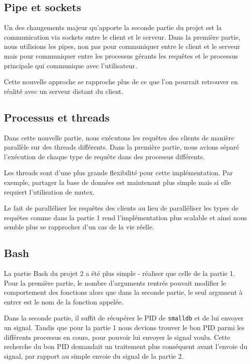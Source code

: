 \documentclass[utf8]{article}
\begin{document}
\subsection{Pipe et sockets}

Un des changements majeur qu'apporte la seconde partie du projet est la communication via sockets entre le client et le serveur. Dans la première partie, nous utilisions les pipes, non pas pour communiquer entre le client et le serveur mais pour communiquer entre les processus gérants les requêtes et le processus principale qui communique avec l'utilisateur.

Cette nouvelle approche se rapproche plus de ce que l'on pourrait retrouver en réalité avec un serveur distant du client.


\subsection{Processus et threads}

Dans cette nouvelle partie, nous exécutons les requêtes des clients de manière parallèle sur des threads différents. Dans la première partie, nous avions séparé l'exécution de chaque type de requête dans des processus différents.

Les threads sont d'une plus grande flexibilité pour cette implémentation. Par exemple, partager la base de données est maintenant plus simple mais si elle requiert l'utilisation de mutex.

Le fait de paralléliser les requêtes des clients au lieu de paralléliser les types de requêtes comme dans la partie 1 rend l'implémentation plus scalable et ainsi nous semble plus se rapprocher d'un cas de la vie réelle.


\subsection{Bash}

La partie Bash du projet 2  a été plus simple - réaliser que celle de la partie 1.
Pour la première partie, le nombre d'arguments rentrés pouvait modifier le comportement des fonctions alors que dans la seconde partie, le seul argument à entrer est le nom de la fonction appelée.

Dans la seconde partie, il suffit de récupérer le PID de \texttt{smalldb} et de lui envoyer un signal. Tandis que pour la partie 1 nous devions trouver le bon PID parmi les différents processus en cours, pour pouvoir lui envoyer le signal voulu. Cette recherche du bon PID demandait un traitement plus conséquent avant l'envoie du signal, par rapport au simple envoie du signal de la partie 2. 
\end{document}
